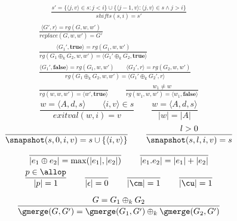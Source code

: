 \begin{figure}
%
\begin{minipage}{0.49\textwidth}\centering
  \begin{gather*}
    \frac{s'=\{\langle j,v\rangle\in s:j<i\}\cup\{\langle j-1,v\rangle:\langle j,v\rangle\in s \land j>i\}}{shifts(s,i) = s'}
  \end{gather*}
  \begin{gather*}
    \frac{\langle G',r\rangle = rg(G,w,w')}
    {replace(G,w,w') = G'} \\
    \frac{\langle G_1',\textbf{true}\rangle = rg(G_1,w,w')}
    {rg(G_1\oplus_k G_2,w,w') = \langle G_1'\oplus_k G_2,\textbf{true}\rangle} \\
    \frac{\langle G_1',\textbf{false}\rangle = rg(G_1,w,w') \qquad \langle G_2',r\rangle = rg(G_2,w,w')}
    {rg(G_1\oplus_k G_2,w,w') = \langle G_1'\oplus_k G_2',r\rangle} \\
    \frac{}{rg(w,w,w') = \langle w',\textbf{true}\rangle} \qquad
    \frac{w_1\ne w}{rg(w_1,w,w') = \langle w_1,\textbf{false}\rangle}
  \end{gather*}
  \[
    \frac{w=\langle A,d,s\rangle \qquad \langle i,v\rangle\in s}
    {exitval(w,i)=v}
  \qquad
    \frac{w=\langle A,d,s\rangle}{|w|=|A|}
  \]
  \[
    \frac{}{\snapshot(s,0,i,v)=s\cup\{\langle i,v\rangle\}}
    \qquad
    \frac{l>0}{\snapshot(s,l,i,v)=s}
  \]
  \begin{gather*}
    \frac{}{|e_1\oplus e_2|=\max(|e_1|,|e_2|)}
    \qquad
    \frac{}{|e_1.e_2|=|e_1|+|e_2|}
  \\
    \frac{p\in\allop}{|p|=1}
    \qquad
    \frac{}{|\epsilon|=0}
    \qquad
    \frac{}{|\cm|=1}
    \qquad
    \frac{}{|\cu|=1}
  \end{gather*}
\end{minipage}
\hspace{5mm}
\begin{minipage}{0.49\textwidth}\centering
  \begin{gather*}
    \frac
      {G=G_1\oplus_k G_2}
      {\gmerge(G,G')=\gmerge(G_1,G')\oplus_k\gmerge(G_2,G')}
  \\

\end{gather*}
\end{minipage}
\end{figure}
